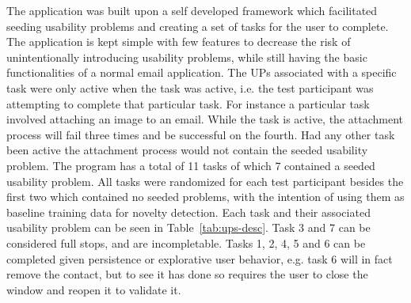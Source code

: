 The application was built upon a self developed framework which facilitated seeding usability problems and creating a set of tasks for the user to complete. 
The application is kept simple with few features to decrease the risk of unintentionally introducing usability problems, while still having the basic functionalities of a normal email application.  
The UPs associated with a specific task were only active when the task was active, i.e. the test participant was
attempting to complete that particular task.
For instance a particular task involved attaching an image to an email. 
While the task is active, the attachment process will fail three times and be successful on the fourth. 
Had any other task been active the attachment process would not contain the seeded usability problem.
The program has a total of 11 tasks of which 7 contained a seeded usability problem. 
All tasks were randomized for each test participant besides the first two which contained no seeded problems, with the
intention of using them as baseline training data for novelty detection. 
Each task and their associated usability problem can be seen in Table~\ref{tab:ups-desc}.
Task 3 and 7 can be considered full stops, and are incompletable.
Tasks 1, 2, 4, 5 and 6 can be completed given persistence or explorative user behavior, e.g. task 6 will in fact remove the contact, but to see it has done so requires the user to close the window and reopen it to validate it.

